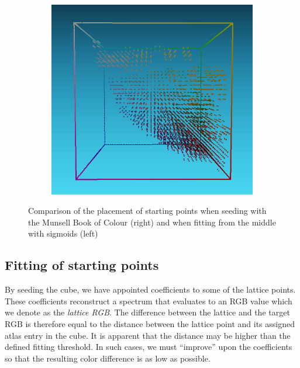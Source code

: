 \begin{figure}[t]
\begin{subfigure}[t]{0.45\textwidth}
		\includegraphics[width=\linewidth]{img/seededStarting_mcb.png}
		\label{fig:seededStarting_mcb}
	\end{subfigure}
	\caption{Comparison of the placement of starting points when seeding with the Munsell Book of Colour (right) and when fitting from the middle with sigmoids (left)}
	\label{fig:seededStartingPoints}
\end{figure}

\subsection{Fitting of starting points} \label{ssec:startingPointsFitting}

By seeding the cube, we have appointed coefficients to some of the lattice points. These coefficients reconstruct a spectrum that evaluates to an RGB value which we denote as the \emph{lattice RGB}. The difference between the lattice and the target RGB is therefore equal to the distance between the lattice point and its assigned atlas entry in the cube. It is apparent that the distance may be higher than the defined fitting threshold. In such cases, we must ``improve'' upon the coefficients so that the resulting color difference is as low as possible.

